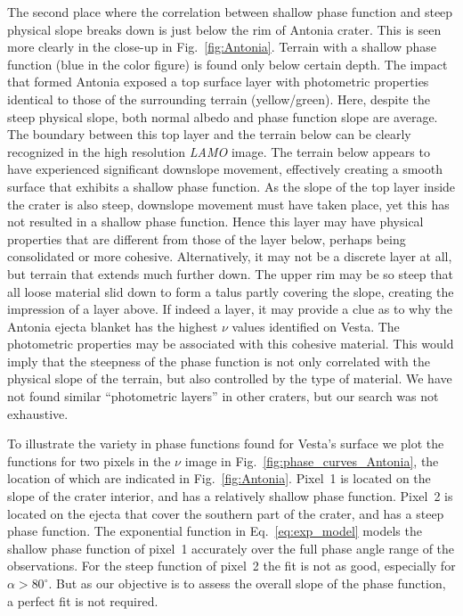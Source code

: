\documentclass[3p,authoryear]{elsarticle}
\begin{document}
The second place where the correlation between shallow phase function and steep physical slope breaks down is just below the rim of Antonia crater. This is seen more clearly in the close-up in Fig.~\ref{fig:Antonia}. Terrain with a shallow phase function (blue in the color figure) is found only below certain depth. The impact that formed Antonia exposed a top surface layer with photometric properties identical to those of the surrounding terrain (yellow/green). Here, despite the steep physical slope, both normal albedo and phase function slope are average. The boundary between this top layer and the terrain below can be clearly recognized in the high resolution {\it LAMO} image. The terrain below appears to have experienced significant downslope movement, effectively creating a smooth surface that exhibits a shallow phase function. As the slope of the top layer inside the crater is also steep, downslope movement must have taken place, yet this has not resulted in a shallow phase function. Hence this layer may have physical properties that are different from those of the layer below, perhaps being consolidated or more cohesive. Alternatively, it may not be a discrete layer at all, but terrain that extends much further down. The upper rim may be so steep that all loose material slid down to form a talus partly covering the slope, creating the impression of a layer above. If indeed a layer, it may provide a clue as to why the Antonia ejecta blanket has the highest $\nu$ values identified on Vesta. The photometric properties may be associated with this cohesive material. This would imply that the steepness of the phase function is not only correlated with the physical slope of the terrain, but also controlled by the type of material. We have not found similar ``photometric layers'' in other craters, but our search was not exhaustive.

To illustrate the variety in phase functions found for Vesta's surface we plot the functions for two pixels in the $\nu$ image in Fig.~\ref{fig:phase_curves_Antonia}, the location of which are indicated in Fig.~\ref{fig:Antonia}. Pixel~1 is located on the slope of the crater interior, and has a relatively shallow phase function. Pixel~2 is located on the ejecta that cover the southern part of the crater, and has a steep phase function. The exponential function in Eq.~\ref{eq:exp_model} models the shallow phase function of pixel~1 accurately over the full phase angle range of the observations. For the steep function of pixel~2 the fit is not as good, especially for $\alpha > 80^\circ$. But as our objective is to assess the overall slope of the phase function, a perfect fit is not required.
\end{document}
